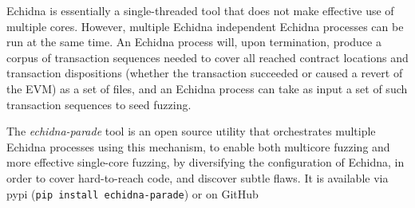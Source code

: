 \documentclass[sigconf]{acmart}
\begin{document}
Echidna is essentially a single-threaded tool that does not make
effective use of multiple cores.  However, multiple Echidna
independent Echidna processes can be run at the same time.  An Echidna
process will, upon termination, produce a corpus of transaction
sequences needed to cover all reached contract locations and
transaction dispositions (whether the transaction succeeded or caused
a revert of the EVM) as a set of files, and an Echidna process can
take as input a set of such transaction sequences to seed fuzzing.

The \emph{echidna-parade} tool is an open source utility that orchestrates multiple
Echidna processes using this mechanism, to enable both multicore
fuzzing and more effective single-core fuzzing, by diversifying the
configuration of Echidna, in order to cover hard-to-reach code, and
discover subtle flaws. It is available via pypi ({\tt pip
    install echidna-parade}) or on GitHub
\end{document}
